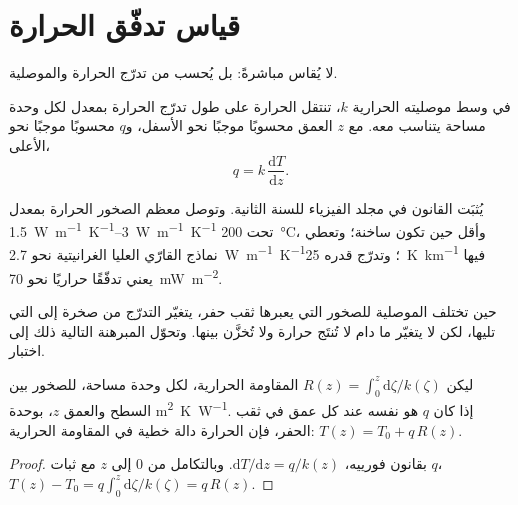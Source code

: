 \section{قياس تدفّق الحرارة}

لا يُقاس  مباشرةً: بل يُحسب من تدرّج الحرارة والموصلية.

\begin{proposition}\label{prop:b1:heat-budget:fourier}
في وسط موصليته الحرارية $k$، تنتقل الحرارة على طول تدرّج الحرارة بمعدل لكل وحدة مساحة يتناسب معه. مع $z$ العمق محسوبًا موجبًا نحو الأسفل، و$q$ محسوبًا موجبًا نحو الأعلى،
\[
  q = k\,\frac{\mathrm dT}{\mathrm dz} .
\]
\end{proposition}
\admitted

يُثبَت القانون في مجلد الفيزياء للسنة الثانية. وتوصل معظم الصخور الحرارة بمعدل \qtyrange{1.5}{3}{W.m^{-1}.K^{-1}} تحت \qty{200}{\celsius}، وأقل حين تكون ساخنة؛ وتعطي نماذج  القارّي  العليا الغرانيتية نحو \qty{2.7}{W.m^{-1}.K^{-1}}؛
وتدرّج قدره \qty{25}{K.km^{-1}} فيها يعني تدفّقًا حراريًا نحو \qty{70}{mW.m^{-2}}.

حين تختلف الموصلية للصخور التي يعبرها ثقب حفر، يتغيّر التدرّج من صخرة إلى التي تليها، لكن  لا يتغيّر ما دام لا تُنتَج حرارة ولا تُخزَّن بينها. وتحوّل المبرهنة التالية ذلك إلى اختبار.

\begin{proposition}\label{prop:b1:heat-budget:bullard}
ليكن $R(z) = \int_0^z \mathrm d\zeta/k(\zeta)$ المقاومة الحرارية، لكل وحدة مساحة، للصخور بين السطح والعمق $z$، بوحدة \unit{m^2.K.W^{-1}}. إذا كان  $q$ هو نفسه عند كل عمق في ثقب الحفر، فإن الحرارة دالة خطية في المقاومة الحرارية: $T(z) = T_0 + q\,R(z)$.
\end{proposition}

\begin{proof}
بقانون فورييه، $\mathrm dT/\mathrm dz = q/k(z)$. وبالتكامل من $0$ إلى $z$ مع ثبات $q$، $T(z) - T_0 = q\int_0^z \mathrm d\zeta/k(\zeta) = q\,R(z)$.
\end{proof}

